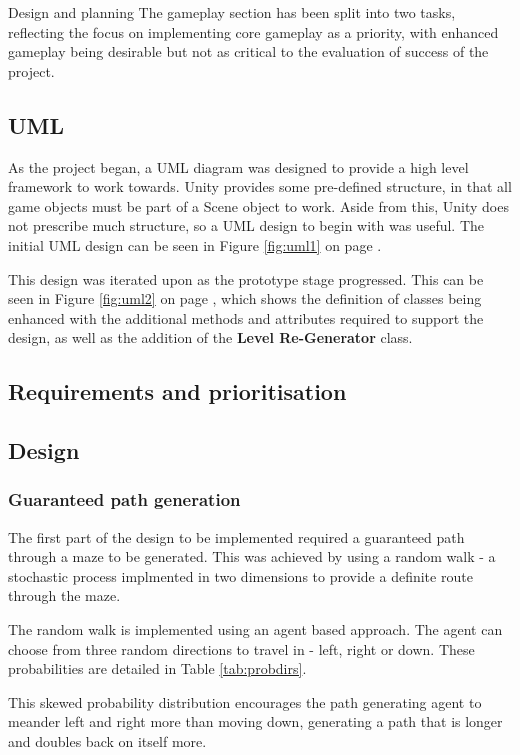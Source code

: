 \documentclass[progress]{cmpreport}
\begin{document}
\begin{section}{Design and planning}
The gameplay section has been split into two tasks, reflecting the focus on implementing core gameplay as a priority, with enhanced gameplay being desirable but not as critical to the evaluation of success of the project.


\subsection{UML}

As the project began, a UML diagram was designed to provide a high level framework to work towards. Unity provides some pre-defined structure, in that all game objects must be part of a Scene object to work. Aside from this, Unity does not prescribe much structure, so a UML design to begin with was useful. The initial UML design can be seen in Figure \ref{fig:uml1} on page \pageref{fig:uml1}.

This design was iterated upon as the prototype stage progressed. This can be seen in Figure \ref{fig:uml2} on page \pageref{fig:uml2}, which shows the definition of classes being enhanced with the additional methods and attributes required to support the design, as well as the addition of the \textbf{Level Re-Generator} class.


\subsection{Requirements and prioritisation}



\subsection{Design}
\subsubsection{Guaranteed path generation}
The first part of the design to be implemented required a guaranteed path through a maze to be generated. This was achieved by using a random walk - a stochastic process implmented in two dimensions to provide a definite route through the maze.

The random walk is implemented using an agent based approach. The agent can choose from three random directions to travel in - left, right or down. These probabilities are detailed in Table \ref{tab:probdirs}.

This skewed probability distribution encourages the path generating agent to meander left and right more than moving down, generating a path that is longer and doubles back on itself more.


\end{section}
\end{document}
